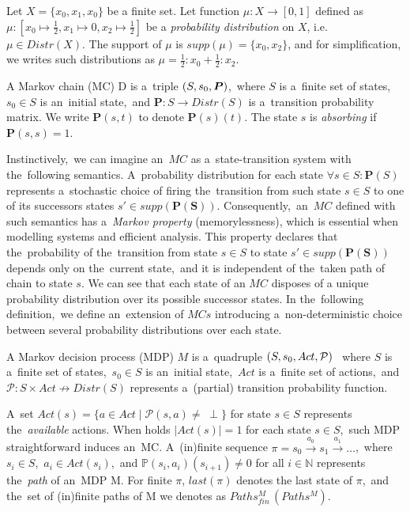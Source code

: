 \begin{example}
    Let $X = \{x_0, x_1, x_0\}$ be a finite set.
    Let function $\mu: X \rightarrow [0,1]$ defined as $\mu: [x_0 \mapsto \frac{1}{2}, x_1 \mapsto 0, x_2 \mapsto \frac{1}{2}]$ be a \textit{probability distribution} on $X$, i.e. $\mu \in Distr(X)$.
    The support of $\mu$ is $supp(\mu) = \{x_0, x_2 \}$, and for simplification, we writes such distributions as $\mu = \frac{1}{2} : x_0 + \frac{1}{2} : x_2$.
\end{example}


\begin{definition}[MC]
\cite{tacas21}
    A Markov chain (MC) D is a~triple $(S,s_{0},\boldsymbol{P})$,~where $S$ is a~finite set of states,~$s_0 \in S$ is an~initial state,~and $\mathbf{P}: S \rightarrow Distr(S)$ is a~transition probability matrix.
    We write $\mathbf{P}(s, t)$ to denote $\mathbf{P}(s)(t)$.
    The state $s$ is \textit{absorbing} if $\mathbf{P}(s, s) = 1$.
\end{definition}

Instinctively,~we can imagine an~$MC$ as a~state-transition system with the~following semantics.
A~probability distribution for each state $\forall s \in S: \mathbf{P}(S)$ represents a~stochastic choice of firing the~transition from such state $s \in S$ to one of its successors states $s' \in supp(\mathbf{P(S)})$.
Consequently,~an~$MC$ defined with such semantics has a~\textit{Markov property} (memorylessness), which is essential when modelling systems and efficient analysis.
This property declares that the~probability of the~transition from state $s \in S$ to state $s' \in supp(\mathbf{P(S)})$ depends only on the~current state,~and it is independent of the~taken path of chain to state $s$.
We can see that each state of an $MC$ disposes of a unique probability distribution over its possible successor states.
In the~following definition,~we define an~extension of $MCs$ introducing a~non-deterministic choice between several probability distributions over each state.

\begin{definition}[MDP]
\cite{roman-DP}
    A Markov decision process (MDP) $M$ is a~quadruple $(S,s_{0},Act,\mathcal{P})$ ~where $S$ is a~finite set of states,~$s_0 \in S$ is an~initial state,~$Act$ is a~finite set of actions,~and $\mathcal{P}: S \times Act  \nrightarrow Distr(S)$ represents a~(partial) transition probability function. 
\end{definition}

A~set $\mathit{Act(s) = \{ a \in Act \; \lvert \; \mathcal{P}(s, a) \neq \; \perp \}}$ for state $s \in S$ represents the~\textit{available} actions.
When holds $\lvert \mathit{Act(s)} \rvert = 1$ for each state $s \in S$,~such MDP straightforward induces an~MC.
A~(in)finite sequence $\pi = s_0 \overset{a_0}{\rightarrow} s_1 \overset{a_1}{\rightarrow} \dots$,~where $s_i \in S$,~$a_i \in Act(s_i)$,~and $\mathbb{P}(s_i, a_i)(s_{i+1}) \neq 0$ for all $i \in \mathbb{N}$ represents the~\textit{path} of an~MDP M.
For finite $\pi$, $last(\pi)$ denotes the last state of $\pi$,~and the~set of (in)finite paths of M we denotes as $Paths_{fin}^{M}\,(Paths^M)$.

